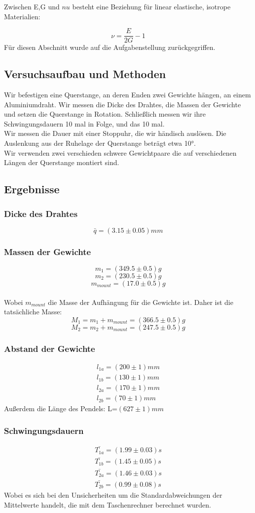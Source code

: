 \documentclass{article}
\begin{document}
Zwischen E,G und $nu$ besteht eine Beziehung für linear elastische, isotrope Materialien:

$$\nu = \frac{E}{2G} -1$$
Für diesen Abschnitt wurde auf die Aufgabenstellung zurückgegriffen.
\subsection{Versuchsaufbau und Methoden}
Wir befestigen eine Querstange, an deren Enden zwei Gewichte hängen, an einem Aluminiumdraht. Wir messen die Dicke des Drahtes, die Massen der Gewichte und setzen die Querstange in Rotation. Schließlich messen wir ihre Schwingungsdauern 10 mal in Folge, und das 10 mal. \\
Wir messen die Dauer mit einer Stoppuhr, die wir händisch auslösen. Die Auslenkung aus der Ruhelage der Querstange beträgt etwa 10°. \\
Wir verwenden zwei verschieden schwere Gewichtpaare die auf verschiedenen Längen der Querstange montiert sind.
\subsection{Ergebnisse}
\subsubsection*{Dicke des Drahtes}
$$\bar{q}=(3.15 \pm 0.05)mm$$ 
\subsubsection*{Massen der Gewichte}
$$m_1=(349.5 \pm 0.5)g$$
$$m_2=(230.5 \pm 0.5)g$$
$$m_{mount}=(17.0 \pm 0.5)g$$\\
Wobei $m_{mount}$ die Masse der Aufhängung für die Gewichte ist. Daher ist die tatsächliche Masse:
$$M_1=m_1+m_{mount}=(366.5 \pm 0.5)g$$
$$M_2=m_2+m_{mount}=(247.5 \pm 0.5)g$$
\subsubsection*{Abstand der Gewichte}
\begin{gather*}
l_{1a}=(200 \pm 1)mm\\
l_{1b}=(130 \pm 1)mm\\
l_{2a}=(170 \pm 1)mm\\
l_{2b}=(70 \pm 1)mm
\end{gather*}
Außerdem die Länge des Pendels: L=$(627 \pm 1)mm$
\subsubsection*{Schwingungsdauern}
\begin{gather*}
\bar{T_{1a}}=(1.99 \pm 0.03)s\\
\bar{T_{1b}}=(1.45 \pm 0.05)s\\
\bar{T_{2a}}=(1.46 \pm 0.03)s\\
\bar{T_{2b}}=(0.99 \pm 0.08)s
\end{gather*}
Wobei es sich bei den Unsicherheiten um die Standardabweichungen der Mittelwerte handelt, die mit dem Taschenrechner berechnet wurden.
\end{document}

